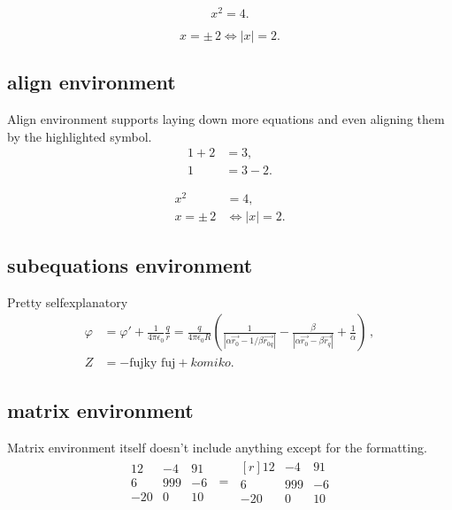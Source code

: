 \documentclass[11pt,a4paper]{report}
\theoremstyle{remark}
\theoremstyle{definition}
\begin{document}
				\begin{equation}
					x^2 = 4.
				\end{equation}
				
				\begin{equation*}
					x = \pm\, 2 \iff |x| = 2.
				\end{equation*}
				
			\subsection*{align environment}
			
				\noindent
				Align environment supports laying down more equations and even aligning them by the highlighted symbol.
				\begin{align*}
					1 + 2 &= 3,
				\\
					1 &= 3 - 2.
				\end{align*}
				
				\begin{align*}
					x^2 &= 4,
				\\
					x = \pm\, 2 &\iff |x| = 2.
				\end{align*}
			
			\subsection*{subequations environment}
			
				\noindent
				Pretty selfexplanatory
				\begin{subequations}
					\begin{align}
						\varphi
						&= \varphi' + \frac{1}{4 \pi \epsilon_0} \frac{q}{r}
						= \frac{q}{4 \pi \epsilon_0 R} \left( \frac{1}{|\alpha \vec{r_0} - 1/\beta \vec{r_{0q}}|} - \frac{\beta}{|\alpha \vec{r_0} - \beta \vec{r_q}|} + \frac{1}{\alpha} \right) \, ,
				\\
						Z &= -\text{fujky fuj} + \textit{komiko}.
					\end{align}
				\end{subequations}
				
			\subsection*{matrix environment}
			
				\noindent
				Matrix environment itself doesn't include anything except for the formatting.
				\begin{align*}
					\begin{matrix}
						12 & -4 & 91
					\\
						6 & 999 & -6
					\\
						-20 & 0 & 10
					\end{matrix}
					\;=\;
					\begin{matrix*}[r]
						12 & -4 & 91
					\\
						6 & 999 & -6
					\\
						-20 & 0 & 10
					\end{matrix*}
				\end{align*}
\end{document}
